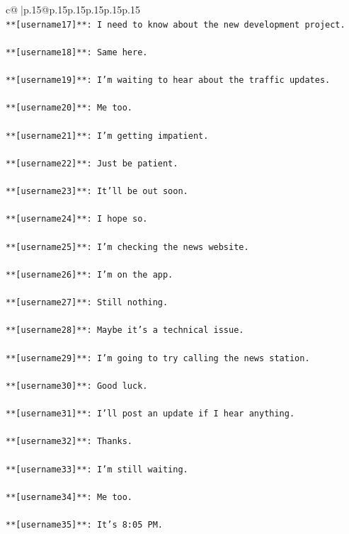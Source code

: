\documentclass{article}
\begin{document}
{\begin{supertabular}{c@{$\;$}|p{.15\linewidth}@{}p{.15\linewidth}p{.15\linewidth}p{.15\linewidth}p{.15\linewidth}p{.15\linewidth}}
{{{\\ 
\texttt{**{[}username17{]}**: I need to know about the new development project.} \\
\\ 
\texttt{**{[}username18{]}**: Same here.} \\
\\ 
\texttt{**{[}username19{]}**: I'm waiting to hear about the traffic updates.} \\
\\ 
\texttt{**{[}username20{]}**: Me too.} \\
\\ 
\texttt{**{[}username21{]}**: I'm getting impatient.} \\
\\ 
\texttt{**{[}username22{]}**: Just be patient.} \\
\\ 
\texttt{**{[}username23{]}**: It'll be out soon.} \\
\\ 
\texttt{**{[}username24{]}**: I hope so.} \\
\\ 
\texttt{**{[}username25{]}**: I'm checking the news website.} \\
\\ 
\texttt{**{[}username26{]}**: I'm on the app.} \\
\\ 
\texttt{**{[}username27{]}**: Still nothing.} \\
\\ 
\texttt{**{[}username28{]}**: Maybe it's a technical issue.} \\
\\ 
\texttt{**{[}username29{]}**: I'm going to try calling the news station.} \\
\\ 
\texttt{**{[}username30{]}**: Good luck.} \\
\\ 
\texttt{**{[}username31{]}**: I'll post an update if I hear anything.} \\
\\ 
\texttt{**{[}username32{]}**: Thanks.} \\
\\ 
\texttt{**{[}username33{]}**: I'm still waiting.} \\
\\ 
\texttt{**{[}username34{]}**: Me too.} \\
\\ 
\texttt{**{[}username35{]}**: It's 8:05 PM.} \\
}}}
\end{supertabular}}
\end{document}
